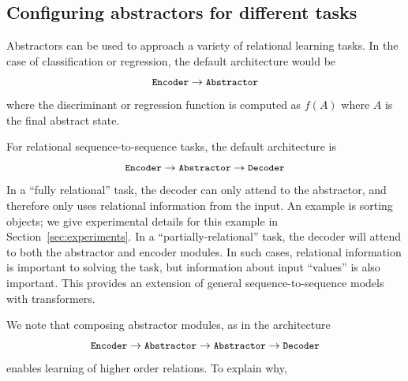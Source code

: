 \subsection{Configuring abstractors for different tasks}
\def\module#1{{\small\texttt{#1}}}

Abstractors can be used to approach a variety of relational learning tasks. In the case of classification 
or regression, the default architecture would be 
$$\module{Encoder} \rightarrow \module{Abstractor}$$
where the discriminant or regression function is computed as $f(A)$ where $A$ is the final abstract state.

For relational sequence-to-sequence tasks, the default architecture is 
$$\module{Encoder} \rightarrow \module{Abstractor} \rightarrow \module{Decoder}$$
In a ``fully relational'' task, the decoder can only attend to the abstractor, and therefore 
only uses relational information from the input. An example is sorting objects; we give 
experimental details for this example in Section~\ref{sec:experiments}.
In a ``partially-relational'' task, the decoder will attend to both the abstractor and encoder modules. In such cases, relational information is important to solving the task, but information about input ``values'' is 
also important. This provides an extension of general sequence-to-sequence models with transformers.


We note that composing abstractor modules, as in the architecture
$$\module{Encoder} \rightarrow \module{Abstractor} \rightarrow \module{Abstractor} \rightarrow \module{Decoder}$$
enables learning of higher order relations. To explain why, 

